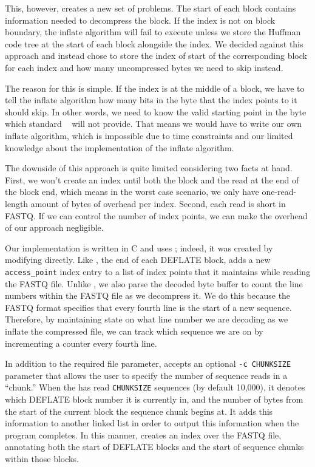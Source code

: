 This, however, creates a new set of problems. The start of each \gzip block
contains information needed to decompress the block. If the index is not on
block boundary, the inflate algorithm will fail to execute unless we store the
Huffman code tree at the start of each block alongside the index. We decided
against this approach and instead chose to store the index of start of the corresponding
block for each index and how many uncompressed bytes we need to skip instead. 

The reason for this is simple. If the index is at the middle of a block, we 
have to tell the inflate algorithm how many bits in the byte that the index points 
to it should skip. In other words, we need to know the valid starting point in the 
byte which standard \zlib~\cite{zlib} will not provide. That means we would have to 
write our own inflate algorithm, which is impossible due to time constraints and 
our limited knowledge about the implementation of the inflate algorithm. 

The downside of this approach is quite limited considering two facts at hand.
First, we won't create an index until both the block and the read at the end of
the block end, which means in the worst case scenario, we only have
one-read-length amount of bytes of overhead per index. Second, each read is
short in FASTQ. If we can control the number of index points, we can make the
overhead of our approach negligible.  

Our \ibuilder implementation is written in C and uses \zlib; indeed, it was
created by modifying \zran directly. Like \zran, the end of each DEFLATE block,
\ibuilder adds a new \texttt{access\_point} index entry to a list of index
points that it maintains while reading the \gzip FASTQ file. Unlike \zran, we
also parse the decoded byte buffer to count the line numbers within the FASTQ
file as we decompress it. We do this because the FASTQ format specifies that
every fourth line is the start of a new sequence. Therefore, by maintaining
state on what line number we are decoding as we inflate the compressed file, we can
track which sequence we are on by incrementing a counter every fourth line. 

In addition to the required \gzip file parameter, \ibuilder accepts an
optional \texttt{-c CHUNKSIZE} parameter that allows the user to specify the
number of sequence reads in a ``chunk.'' When the \ibuilder has read
\texttt{CHUNKSIZE} sequences (by default 10,000), it denotes which DEFLATE block
number it is currently in, and the number of bytes from the start of the current
block the sequence chunk begins at. It adds this information to another linked
list in order to output this information when the program completes. In this
manner, \ibuilder creates an index over the \gzip FASTQ file, annotating both
the start of \gzip DEFLATE blocks and the start of sequence chunks within those
blocks. 

